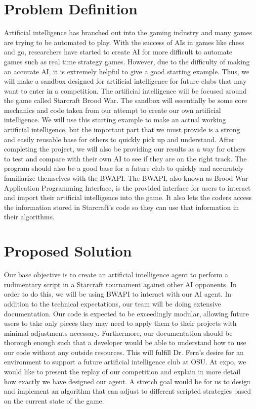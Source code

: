 \documentclass[10pt,letterpaper,onecolumn,draftclsnofoot]{IEEEtran}
\begin{document}
\section{Problem Definition}
Artificial intelligence has branched out into the gaming industry and many games are trying to be automated to play. With the success of AIs in games like chess and go, researchers have started to create AI for more difficult to automate games such as real time strategy games. However, due to the difficulty of making an accurate AI, it is extremely helpful to give a good starting example. Thus, we will make a sandbox designed for artificial intelligence for future clubs that may want to enter in a competition. The artificial intelligence will be focused around the game called Starcraft Brood War. The sandbox will essentially be some core mechanics and code taken from our attempt to create our own artificial intelligence. We will use this starting example to make an actual working artificial intelligence, but the important part that we must provide is a strong and easily reusable base for others to quickly pick up and understand. After completing the project, we will also be providing our results as a way for others to test and compare with their own AI to see if they are on the right track. The program should also be a good base for a future club to quickly and accurately familiarize themselves with the BWAPI. The BWAPI, also known as Brood War Application Programming Interface, is the provided interface for users to interact and import their artificial intelligence into the game. It also lets the coders access the information stored in Starcraft's code so they can use that information in their algorithms.

\section{Proposed Solution}
Our base objective is to create an artificial intelligence agent to perform a rudimentary script in a Starcraft tournament against other AI opponents. In order to do this, we will be using BWAPI to interact with our AI agent. In addition to the technical expectations, our team will be doing extensive documentation. Our code is expected to be exceedingly modular, allowing future users to take only pieces they may need to apply them to their projects with minimal adjustments necessary. Furthermore, our documentation should be thorough enough such that a developer would be able to understand how to use our code without any outside resources. This will fulfill Dr. Fern's desire for an environment to support a future artificial intelligence club at OSU. At expo, we would like to present the replay of our competition and explain in more detail how exactly we have designed our agent. A stretch goal would be for us to design and implement an algorithm that can adjust to different scripted strategies based on the current state of the game. 
\end{document}
